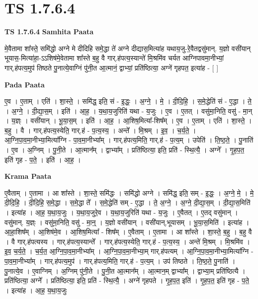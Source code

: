 \documentclass[17pt]{extarticle}
\begin{document}
\section*{ TS 1.7.6.4 }

\textbf{TS 1.7.6.4 } \newline
\textbf{Samhita Paata} \newline

मे॒वैतामा शा᳚स्ते॒ समि॑द्धो अग्ने मे दीदिहि समे॒द्धा ते॑ अग्ने दीद्यास॒मित्या॑ह यथाय॒जु-रे॒वैतद्वसु॑मान्. य॒ज्ञो वसी॑यान् भूयास॒-मित्या॑हा॒-ऽऽशिष॑मे॒वेतामा शा᳚स्ते ब॒हु वै गार्.ह॑पत्य॒स्यान्ते॑ मि॒श्रमि॑व चर्यत आग्निपावमा॒नीभ्यां॒ गार्.ह॑पत्य॒मुप॑ तिष्ठते पु॒नात्ये॒वाग्निं पु॑नी॒त आ॒त्मानं॒ द्वाभ्यां॒ प्रति॑ष्ठित्या॒ अग्ने॑ गृहपत॒ इत्या॑ह - [ ] \newline

\textbf{Pada Paata} \newline

ए॒व । ए॒ताम् । एति॑ । शा॒स्ते॒ । समि॑द्ध॒ इति॒ सं - इ॒द्धः॒ । अ॒ग्ने॒ । मे॒ । दी॒दि॒हि॒ । स॒मे॒द्धेति॑ सं - ए॒द्धा । ते॒ । अ॒ग्ने॒ । दी॒द्या॒स॒म् । इति॑ । आ॒ह॒ । य॒था॒य॒जुरिति॑ यथा - य॒जुः । ए॒व । ए॒तत् । वसु॑मा॒निति॒ वसु॑ - मा॒न् । य॒ज्ञ्ः । वसी॑यान् । भू॒या॒स॒म् । इति॑ । आ॒ह॒ । आ॒शिष॒मित्या᳚-शिष᳚म् । ए॒व । ए॒ताम् । एति॑ । शा॒स्ते॒ । ब॒हु । वै । गार्.ह॑पत्य॒स्येति॒ गार्.ह॑ - प॒त्य॒स्य॒ । अन्ते᳚ । मि॒श्रम् । इ॒व॒ । च॒र्य॒ते॒ । आ॒ग्नि॒पा॒व॒मा॒नीभ्या॒मित्या᳚ग्नि - पा॒व॒मा॒नीभ्या᳚म् । गार्.ह॑पत्य॒मिति॒ गार्.ह॑ - प॒त्य॒म् । उपेति॑ । ति॒ष्ठ॒ते॒ । पु॒नाति॑ । ए॒व । अ॒ग्निम् । पु॒नी॒ते । आ॒त्मान᳚म् । द्वाभ्या᳚म् । प्रति॑ष्ठित्या॒ इति॒ प्रति॑ - स्थि॒त्यै॒ । अग्ने᳚ । गृ॒ह॒प॒त॒ इति॑ गृह - प॒ते॒ । इति॑ । आ॒ह॒ ।  \newline


\textbf{Krama Paata} \newline

ए॒वैताम् । ए॒तामा । आ शा᳚स्ते । शा॒स्ते॒ समि॑द्धः । समि॑द्धो अग्ने । समि॑द्ध॒ इति॒ सम् - इ॒द्धः॒ । अ॒ग्ने॒ मे॒ । मे॒ दी॒दि॒हि॒ । दी॒दि॒हि॒ स॒मे॒द्धा । स॒मे॒द्धा ते᳚ । स॒मे॒द्धेति॑ सम् - ए॒द्धा । ते॒ अ॒ग्ने॒ । अ॒ग्ने॒ दी॒द्या॒स॒म् । दी॒द्या॒स॒मिति॑ । इत्या॑ह । आ॒ह॒ य॒था॒य॒जुः । य॒था॒य॒जुरे॒व । य॒था॒य॒जुरिति॑ यथा - य॒जुः । ए॒वैतत् । ए॒तद् वसु॑मान् । वसु॑मान्. य॒ज्ञ्ः । वसु॑मा॒निति॒ वसु॑ - मा॒न्॒ । य॒ज्ञो वसी॑यान् । वसी॑यान्,भूयासम् । भू॒या॒स॒मिति॑ । इत्या॑ह । आ॒हा॒शिष᳚म् । आ॒शिष॑मे॒व । आ॒शिष॒मित्या᳚ - शिष᳚म् । ए॒वैताम् । ए॒तामा । आ शा᳚स्ते । शा॒स्ते॒ ब॒हु । ब॒हु वै । वै गार्.ह॑पत्यस्य । गार्.ह॑पत्य॒स्यान्ते᳚ । गार्.ह॑पत्य॒स्येति॒ गार्.ह॑ - प॒त्य॒स्य॒ । अन्ते॑ मि॒श्रम् । मि॒श्रमि॑व । इ॒व॒ च॒र्य॒ते॒ । च॒र्य॒त॒ आ॒ग्नि॒पा॒व॒मा॒नीभ्या᳚म् । आ॒ग्नि॒पा॒व॒मा॒नीभ्या॒म् गार्.ह॑पत्यम् । आ॒ग्नि॒पा॒व॒मा॒नीभ्या॒मित्या᳚ग्नि - पा॒व॒मा॒नीभ्या᳚म् । गार्.ह॑पत्य॒मुप॑ । गार्.ह॑पत्य॒मिति॒ गार्.ह॑ - प॒त्य॒म् । उप॑ तिष्ठते । ति॒ष्ठ॒ते॒ पु॒नाति॑ । पु॒नात्ये॒व । ए॒वाग्निम् । अ॒ग्निम् पु॑नी॒ते । पु॒नी॒त आ॒त्मान᳚म् । आ॒त्मान॒म् द्वाभ्या᳚म् । द्वाभ्या॒म् प्रति॑ष्ठित्यै । प्रति॑ष्ठित्या॒ अग्ने᳚ । प्रति॑ष्ठित्या॒ इति॒ प्रति॑ - स्थि॒त्यै॒ । अग्ने॑ गृहपते । गृ॒ह॒प॒त॒ इति॑ । गृ॒ह॒प॒त॒ इति॑ गृह - प॒ते॒ । इत्या॑ह । आ॒ह॒ य॒था॒य॒जुः \newline
\end{document}

